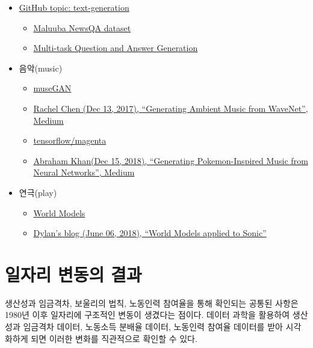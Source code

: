 \documentclass[smallextended]{svjour3}       %
\providecommand{\tightlist}{%
  \setlength{\itemsep}{0pt}\setlength{\parskip}{0pt}}
\begin{document}
\begin{itemize}
\tightlist
\item
  \href{https://github.com/topics/text-generation}{GitHub topic:
  text-generation}

  \begin{itemize}
  \tightlist
  \item
    \href{https://github.com/Maluuba/newsqa}{Maluuba NewsQA dataset}
  \item
    \href{https://github.com/Maluuba/qgen-workshop}{Multi-task Question
    and Answer Generation}
  \end{itemize}
\item
  음악(music)

  \begin{itemize}
  \tightlist
  \item
    \href{https://salu133445.github.io/musegan/}{museGAN}
  \item
    \href{https://medium.com/@rachelchen_49210/generating-ambient-noise-from-wavenet-95aa7f0a8f77}{Rachel
    Chen (Dec 13, 2017), ``Generating Ambient Music from WaveNet'',
    Medium}
  \item
    \href{https://github.com/tensorflow/magenta}{tensorflow/magenta}
  \item
    \href{https://towardsdatascience.com/generating-pokemon-inspired-music-from-neural-networks-bc240014132}{Abraham
    Khan(Dec 15, 2018), ``Generating Pokemon-Inspired Music from Neural
    Networks'', Medium}
  \end{itemize}
\item
  연극(play)

  \begin{itemize}
  \tightlist
  \item
    \href{https://worldmodels.github.io/}{World Models}
  \item
    \href{https://dylandjian.github.io/world-models/}{Dylan's blog (June
    06, 2018), ``World Models applied to Sonic''}
  \end{itemize}
\end{itemize}

\hypertarget{wage-productivity-result}{%
\section{일자리 변동의 결과}\label{wage-productivity-result}}

생산성과 임금격차, 보울리의 법칙, 노동인력 참여율을 통해 확인되는 공통된
사항은 1980년 이후 일자리에 구조적인 변동이 생겼다는 점이다. 데이터
과학을 활용하여 생산성과 임금격차 데이터, 노동소득 분배율 데이터,
노동인력 참여율 데이터를 받아 시각화하게 되면 이러한 변화를 직관적으로
확인할 수 있다.
\end{document}
